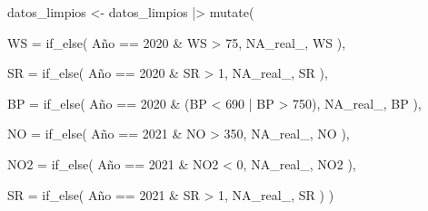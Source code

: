 \documentclass[
  letterpaper,
  DIV=11,
  numbers=noendperiod]{scrartcl}
\newenvironment{Shaded}{\begin{snugshade}}{\end{snugshade}}
\newcommand{\AttributeTok}[1]{\textcolor[rgb]{0.40,0.45,0.13}{#1}}
\newcommand{\ConstantTok}[1]{\textcolor[rgb]{0.56,0.35,0.01}{#1}}
\newcommand{\DecValTok}[1]{\textcolor[rgb]{0.68,0.00,0.00}{#1}}
\newcommand{\FunctionTok}[1]{\textcolor[rgb]{0.28,0.35,0.67}{#1}}
\newcommand{\NormalTok}[1]{\textcolor[rgb]{0.00,0.23,0.31}{#1}}
\newcommand{\OtherTok}[1]{\textcolor[rgb]{0.00,0.23,0.31}{#1}}
\newcommand{\SpecialCharTok}[1]{\textcolor[rgb]{0.37,0.37,0.37}{#1}}
\begin{document}
\begin{Shaded}
\begin{Highlighting}[]
\NormalTok{datos\_limpios }\OtherTok{\textless{}{-}}\NormalTok{ datos\_limpios }\SpecialCharTok{|\textgreater{}}
  \FunctionTok{mutate}\NormalTok{(}
    
    \AttributeTok{WS =} \FunctionTok{if\_else}\NormalTok{(}
\NormalTok{      Año }\SpecialCharTok{==} \DecValTok{2020} \SpecialCharTok{\&}\NormalTok{ WS }\SpecialCharTok{\textgreater{}} \DecValTok{75}\NormalTok{,}
      \ConstantTok{NA\_real\_}\NormalTok{,}
\NormalTok{      WS}
\NormalTok{    ),}
    
    \AttributeTok{SR =} \FunctionTok{if\_else}\NormalTok{(}
\NormalTok{      Año }\SpecialCharTok{==} \DecValTok{2020} \SpecialCharTok{\&}\NormalTok{ SR }\SpecialCharTok{\textgreater{}} \DecValTok{1}\NormalTok{,}
      \ConstantTok{NA\_real\_}\NormalTok{,}
\NormalTok{      SR}
\NormalTok{    ),}
    
    \AttributeTok{BP =} \FunctionTok{if\_else}\NormalTok{(}
\NormalTok{      Año }\SpecialCharTok{==} \DecValTok{2020} \SpecialCharTok{\&}\NormalTok{ (BP }\SpecialCharTok{\textless{}} \DecValTok{690} \SpecialCharTok{|}\NormalTok{ BP }\SpecialCharTok{\textgreater{}} \DecValTok{750}\NormalTok{),}
      \ConstantTok{NA\_real\_}\NormalTok{,}
\NormalTok{      BP}
\NormalTok{    ),}
    
    \AttributeTok{NO =} \FunctionTok{if\_else}\NormalTok{(}
\NormalTok{      Año }\SpecialCharTok{==} \DecValTok{2021} \SpecialCharTok{\&}\NormalTok{ NO }\SpecialCharTok{\textgreater{}} \DecValTok{350}\NormalTok{,}
      \ConstantTok{NA\_real\_}\NormalTok{,}
\NormalTok{      NO}
\NormalTok{    ),}
    
    \AttributeTok{NO2 =} \FunctionTok{if\_else}\NormalTok{(}
\NormalTok{      Año }\SpecialCharTok{==} \DecValTok{2021} \SpecialCharTok{\&}\NormalTok{ NO2 }\SpecialCharTok{\textless{}} \DecValTok{0}\NormalTok{,}
      \ConstantTok{NA\_real\_}\NormalTok{,}
\NormalTok{      NO2}
\NormalTok{    ),}
    
    \AttributeTok{SR =} \FunctionTok{if\_else}\NormalTok{(}
\NormalTok{      Año }\SpecialCharTok{==} \DecValTok{2021} \SpecialCharTok{\&}\NormalTok{ SR }\SpecialCharTok{\textgreater{}} \DecValTok{1}\NormalTok{,}
      \ConstantTok{NA\_real\_}\NormalTok{,}
\NormalTok{      SR}
\NormalTok{    )}
\NormalTok{  )}
\end{Highlighting}
\end{Shaded}
\end{document}
